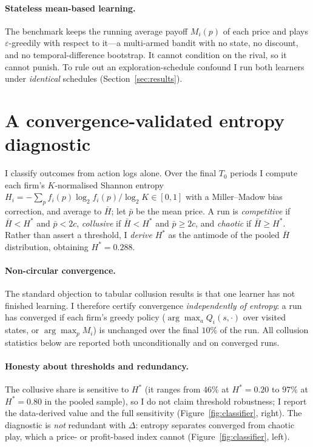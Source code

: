 \documentclass[11pt]{article}
\begin{document}
\paragraph{Stateless mean-based learning.} The benchmark keeps the running average payoff $M_i(p)$ of each
price and plays $\varepsilon$-greedily with respect to it---a multi-armed bandit with no state, no discount,
and no temporal-difference bootstrap. It cannot condition on the rival, so it cannot punish. To rule out an
exploration-schedule confound I run both learners under \emph{identical} schedules (Section~\ref{sec:results}).

\section{A convergence-validated entropy diagnostic}\label{sec:diag}
I classify outcomes from action logs alone. Over the final $T_0$ periods I compute each firm's
$K$-normalised Shannon entropy $H_i=-\!\sum_p f_i(p)\log_2 f_i(p)/\log_2 K\in[0,1]$ with a Miller--Madow
bias correction, and average to $\bar H$; let $\bar p$ be the mean price. A run is \emph{competitive} if
$\bar H<H^\ast$ and $\bar p<2c$, \emph{collusive} if $\bar H<H^\ast$ and $\bar p\ge 2c$, and \emph{chaotic}
if $\bar H\ge H^\ast$. Rather than assert a threshold, I \emph{derive} $H^\ast$ as the antimode of the
pooled $\bar H$ distribution, obtaining $H^\ast=0.288$.

\paragraph{Non-circular convergence.} The standard objection to tabular collusion results is that one
learner has not finished learning. I therefore certify convergence \emph{independently of entropy}: a run
has converged if each firm's greedy policy ($\arg\max_a Q_i(s,\cdot)$ over visited states, or $\arg\max_p
M_i$) is unchanged over the final $10\%$ of the run. All collusion statistics below are reported both
unconditionally and on converged runs.

\paragraph{Honesty about thresholds and redundancy.} The collusive share is sensitive to $H^\ast$ (it ranges
from $46\%$ at $H^\ast=0.20$ to $97\%$ at $H^\ast=0.80$ in the pooled sample), so I do not claim threshold
robustness; I report the data-derived value and the full sensitivity (Figure~\ref{fig:classifier}, right).
The diagnostic is \emph{not} redundant with $\Delta$: entropy separates converged from chaotic play, which a
price- or profit-based index cannot (Figure~\ref{fig:classifier}, left).
\end{document}
